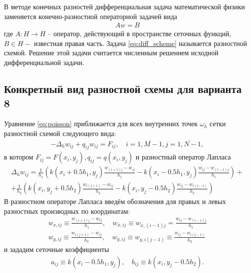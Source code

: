 \documentclass[12pt, fleqn]{article}
\theoremstyle{definition}
\begin{document}
В методе конечных разностей дифференциальная задача математической физики заменяется конечно-разностной операторной задачей вида
\abovedisplayskip=1pt
\belowdisplayskip=2pt
\noindent
\begin{gather}
A w=B
\label{eq:diff_scheme}
\end{gather}
где $A: H \rightarrow H$ -- оператор, действующий в пространстве сеточных функций, $B \in H-$ известная правая часть. Задача \ref{eq:diff_scheme} называется разностной схемой. Решение этой задачи считается численным решением исходной дифференциальной задачи.
\subsection{Конкретный вид разностной схемы для варианта 8}
Уравнение \ref{eq:poisson} приближается для всех внутренних точек $\omega_h$ сетки разностной схемой следующего вида:
\abovedisplayskip=1pt
\belowdisplayskip=2pt
\noindent
\begin{gather*}
 -\Delta_{h} w_{i j}+q_{i j} w_{i j}=F_{i j}, \quad i=\overline{1, M-1}, j=\overline{1, N-1},
\end{gather*}
в котором  $F_{i j}=F\left(x_{i}, y_{j}\right), q_{i j}=q\left(x_{i}, y_{j}\right)$ и  разностный оператор Лапласа
\begin{gather*}
\Delta_{h} w_{i j}= \frac{1}{h_{1}}\left(k\left(x_{i}+0.5 h_{1}, y_{j}\right) \frac{w_{(i+1) j}-w_{i j}}{h_{1}}-k\left(x_{i}-0.5 h_{1}, y_{j}\right) \frac{w_{i j}-w_{(i-1) j}}{h_{1}}\right)+\\
+\frac{1}{h_{2}}\left(k\left(x_{i}, y_{j}+0.5 h_{2}\right) \frac{w_{i (j+1)}-w_{i j}}{h_{2}}-k\left(x_{i}, y_{j}-0.5 h_{2}\right) \frac{w_{i j}-w_{i (j-1)}}{h_{2}}\right)
\end{gather*}
В разностном операторе Лапласа введём обозначения для правых и левых разностных производных по координатам:
\begin{gather*}
w_{x, i j} \equiv \frac{w_{(i+1) j} - w_{i j}}{h_{1}}, \quad w_{\overline{x}, i j} \equiv w_{x, (i-1) j}=\frac{w_{i j}-w_{(i-1) j}}{h_{1}}\\
w_{y, i j} \equiv \frac{w_{i (j+1)}-w_{i j}}{h_{2}}, \quad w_{\overline{y}, i j} \equiv w_{y, i (j-1)} \equiv \frac{w_{i j}-w_{i (j-1)}}{h_{2}}
\end{gather*}
и зададим сеточные коэффициенты
\begin{gather*}
a_{i j} \equiv k\left(x_{i}-0.5 h_{1}, y_{j}\right), \quad b_{i j}\equiv k\left(x_{i}, y_{j}-0.5 h_{2}\right).
\end{gather*}
\end{document}
